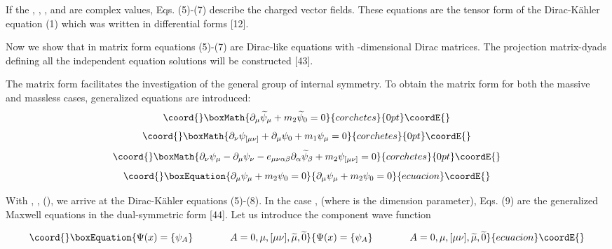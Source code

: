 \documentclass[a4paper,12pt]{article}
\begin{document}
If the \myHighlight{$\varphi $}\coordHE{}, \myHighlight{$\widetilde{\varphi }$}\coordHE{}, \myHighlight{$\varphi _\mu $}\coordHE{},
\myHighlight{$\widetilde{ \varphi }_\mu $}\coordHE{} and \myHighlight{$\varphi _{\mu \nu }$}\coordHE{} are complex
values, Eqs. (5)-(7) describe the charged vector fields. These
equations are the tensor form of the Dirac-K\"ahler equation (1)
which was written in differential forms [12].

Now we show that in matrix form equations (5)-(7) are Dirac-like equations
with \coordHE{} -dimensional Dirac matrices. The projection matrix-dyads
defining all the \coordHE{} independent equation solutions will be constructed
[43].

The matrix form facilitates the investigation of the general group of
internal symmetry. To obtain the matrix form for both the massive and
massless cases, generalized equations are introduced:
\[\coord{}\boxMath{
\partial _\mu \widetilde{\psi }_\mu +m_2\widetilde{\psi }_0=0
}{corchetes}{0pt}\coordE{}\]
\[\coord{}\boxMath{
\partial _\nu \psi _{[\mu \nu ]}+\partial _\mu \psi _0+m_1\psi _\mu =0
}{corchetes}{0pt}\coordE{}\]
\[\coord{}\boxMath{
\partial _\nu \psi _\mu -\partial _\mu \psi _\nu -e_{\mu \nu \alpha \beta
}\partial _\alpha \widetilde{\psi }_\beta +m_2\psi _{[\mu \nu ]}=0
}{corchetes}{0pt}\coordE{}\]
\begin{equation}\coord{}\boxEquation{
\partial _\mu \psi _\mu +m_2\psi _0=0  \label{9}
}{
\partial _\mu \psi _\mu +m_2\psi _0=0  }{ecuacion}\coordE{}\end{equation}

With \coordHE{}  \coordHE{}, \myHighlight{$\psi _\mu =\varphi _\mu $}\coordHE{},
\myHighlight{$\psi _{[\mu \nu ]}=\varphi _{\mu \nu },$}\coordHE{}  \coordHE{}  \coordHE{}  \coordHE{} (\coordHE{}), we arrive
at the Dirac-K\"ahler equations (5)-(8). In the case \coordHE{}, \coordHE{} (where \coordHE{} is the dimension parameter), Eqs. (9) are
the generalized Maxwell equations in the dual-symmetric form [44].
Let us introduce the \coordHE{}component wave function

\begin{equation}\coord{}\boxEquation{
\Psi (x)=\left\{ \psi _A\right\} \hspace{0.5in}A=0,\mu ,[\mu \nu
],\widetilde{\mu },\widetilde{0} \label{10}
}{
\Psi (x)=\left\{ \psi _A\right\} \hspace{0.5in}A=0,\mu ,[\mu \nu
],\widetilde{\mu },\widetilde{0} }{ecuacion}\coordE{}\end{equation}
\end{document}

